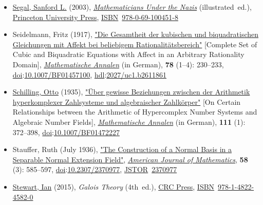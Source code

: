 \begin{itemize}
\item
  \href{https://en.wikipedia.org/wiki/Sanford_L._Segal}{Segal, Sanford L.} (2003), \href{https://books.google.com/books?id=Xa8CNCyohBQC}{\emph{Mathematicians Under the Nazis}} (illustrated{~}ed.), \href{https://en.wikipedia.org/wiki/Princeton_University_Press}{Princeton University Press}, \href{https://en.wikipedia.org/wiki/ISBN_(identifier)}{ISBN}{~}\href{https://en.wikipedia.org/wiki/Special:BookSources/978-0-69-100451-8}{978-0-69-100451-8}{}
\item
  Seidelmann, Fritz (1917), \href{https://gdz.sub.uni-goettingen.de/id/PPN317489526}{"Die Gesamtheit der kubischen und biquadratischen Gleichungen mit Affekt bei beliebigem Rationalitätsbereich"} {{[}}Complete Set of Cubic and Biquadratic Equations with Affect in an Arbitrary Rationality Domain{{]}}, \emph{\href{https://en.wikipedia.org/wiki/Mathematische_Annalen}{Mathematische Annalen}} (in German), \textbf{78} ({1--}4): {230--}233, \href{https://en.wikipedia.org/wiki/Doi_(identifier)}{doi}:\href{https://doi.org/10.1007\%2FBF01457100}{10.1007/BF01457100}, \href{https://en.wikipedia.org/wiki/Hdl_(identifier)}{hdl}:{\href{https://hdl.handle.net/2027\%2Fuc1.b2611861}{2027/uc1.b2611861}}{}
\item
  \href{https://en.wikipedia.org/wiki/Otto_Schilling}{Schilling, Otto} (1935), \href{http://gdz.sub.uni-goettingen.de/dms/resolveppn/?PPN=GDZPPN002277816}{"Über gewisse Beziehungen zwischen der Arithmetik hyperkomplexer Zahlsysteme und algebraischer Zahlkörper"} {{[}}On Certain Relationships between the Arithmetic of Hypercomplex Number Systems and Algebraic Number Fields{{]}}, \emph{\href{https://en.wikipedia.org/wiki/Mathematische_Annalen}{Mathematische Annalen}} (in German), \textbf{111} (1): {372--}398, \href{https://en.wikipedia.org/wiki/Doi_(identifier)}{doi}:\href{https://doi.org/10.1007\%2FBF01472227}{10.1007/BF01472227}{}
\item
  Stauffer, Ruth (July 1936), \href{https://archive.org/details/sim_american-journal-of-mathematics_1936-07_58_3/page/584}{"The Construction of a Normal Basis in a Separable Normal Extension Field"}, \emph{\href{https://en.wikipedia.org/wiki/American_Journal_of_Mathematics}{American Journal of Mathematics}}, \textbf{58} (3): {585--}597, \href{https://en.wikipedia.org/wiki/Doi_(identifier)}{doi}:\href{https://doi.org/10.2307\%2F2370977}{10.2307/2370977}, \href{https://en.wikipedia.org/wiki/JSTOR_(identifier)}{JSTOR}{~}\href{https://www.jstor.org/stable/2370977}{2370977}{}
\item
  \href{https://en.wikipedia.org/wiki/Ian_Stewart_(mathematician)}{Stewart, Ian} (2015), \emph{Galois Theory} (4th{~}ed.), \href{https://en.wikipedia.org/wiki/CRC_Press}{CRC Press}, \href{https://en.wikipedia.org/wiki/ISBN_(identifier)}{ISBN}{~}\href{https://en.wikipedia.org/wiki/Special:BookSources/978-1-4822-4582-0}{978-1-4822-4582-0}{}

\end{itemize}
